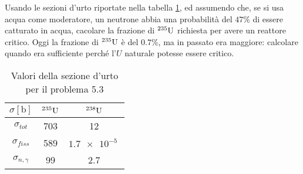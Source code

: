 \documentclass[../main.tex]{subfile}
\begin{document}
	\begin{ese}[5.3]
		Usando le sezioni d'urto riportate nella tabella \ref{tbl:CrossSectionData}, ed assumendo che, se si usa acqua come moderatore, un neutrone abbia una probabilità del $47\%$ di essere catturato in acqua, cacolare la frazione di $ ^{235}\mathrm{U} $ richiesta per avere un reattore critico. Oggi la frazione di $ ^{235}\mathrm{U} $ è del $ 0.7\% $, ma in passato era maggiore: calcolare quando era sufficiente perché l'$ U $ naturale potesse essere critico.
		\begin{table}[]
			\centering
			\caption{Valori della sezione d'urto per il problema 5.3}
			\label{tbl:CrossSectionData}
			\begin{tabular}{c|cc}
				$\sigma [\si{\barn}]$ & $^{235}\mathrm{U}$
				 & $^{238}\mathrm{U}$    \\ \hline
				$\sigma_{tot}$                            & 703                                  & 12                  \\
				$\sigma_{fiss}$                           & 589                                  & $\SI{1.7e-5}{}$ \\
				$\sigma_{n,\gamma}$               & 99                                   & 2.7                
			\end{tabular}
		\end{table}
	\end{ese}
\end{document}
